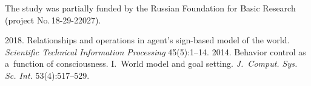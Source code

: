  \Ack
  \noindent
  The study was partially funded by the Russian Foundation for Basic Research (project 
No.\,18-29-22027).



  \begin{multicols}{2}

\renewcommand{\bibname}{\protect\rmfamily References}

{\small\frenchspacing
 {%
 \begin{thebibliography}{99}
  
   2018. Relationships and operations in agent's 
sign-based model of the world. \textit{Scientific Technical Information Processing}
45(5):1--14.
   2014. Behavior control as 
  a~function of consciousness. I.~World model and goal setting. 
  \textit{J.~Comput. Sys. Sc. Int.} 53(4):517--529.
  

\end{thebibliography}}}
\end{multicols}
